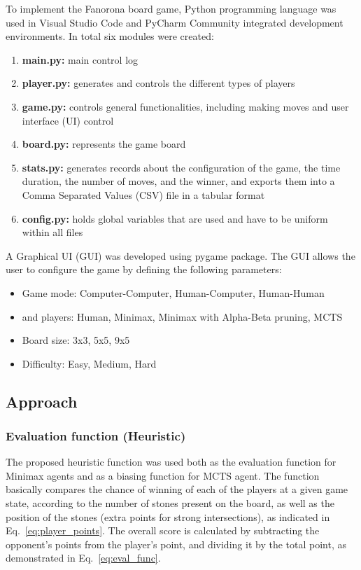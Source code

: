 \documentclass[journal]{IEEEtran}
\begin{document}
To implement the Fanorona board game, Python programming language was used in Visual Studio Code and PyCharm Community integrated development environments. In total six modules were created:

\begin{enumerate}
    \item \textbf{main.py:} main control log
    \item \textbf{player.py:} generates and controls the different types of players
    \item \textbf{game.py:} controls general functionalities, including making moves and user interface (UI) control
    \item \textbf{board.py:} represents the game board
    \item \textbf{stats.py:} generates records about the configuration of the game, the time duration, the number of moves, and the winner, and exports them into a Comma Separated Values (CSV) file in a  tabular format
    \item \textbf{config.py:} holds global variables that are used and have to be uniform within all files
    
\end{enumerate}

A Graphical UI (GUI) was developed using pygame package. The GUI allows the user to configure the game by defining the following parameters:

\begin{itemize}
  \item Game mode: Computer-Computer, Human-Computer, Human-Human
  \item {} and  players: Human, Minimax, Minimax with Alpha-Beta pruning, MCTS
  \item Board size: 3x3, 5x5, 9x5
  \item Difficulty: Easy, Medium, Hard
\end{itemize}

\subsection{Approach}

\subsubsection{Evaluation function (Heuristic)}
The proposed heuristic function was used both as the evaluation function for Minimax agents and as a biasing function for MCTS agent. The function basically compares the chance of winning of each of the players at a given game state, according to the number of stones present on the board, as well as the position of the stones (extra points for strong intersections), as indicated in Eq.~\ref{eq:player_points}. The overall score is calculated by subtracting the opponent's points from the player's point, and dividing it by the total point, as demonstrated in Eq.~\ref{eq:eval_func}.
\end{document}
